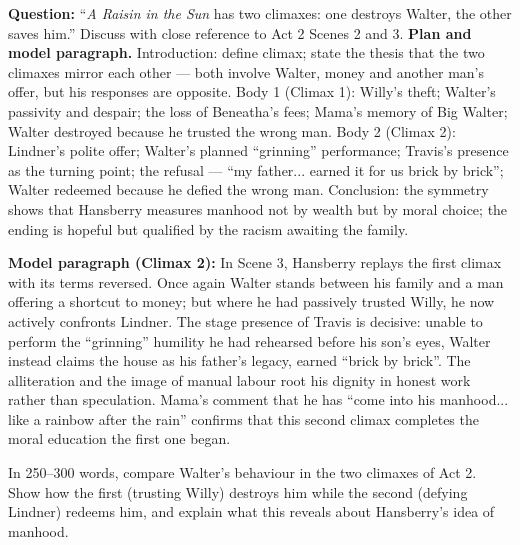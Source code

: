 \documentclass[11pt]{article}
\begin{document}
\begin{exoresolu}
\textbf{Question:} ``\emph{A Raisin in the Sun} has two climaxes: one destroys Walter, the other saves him.'' Discuss with close reference to Act 2 Scenes 2 and 3.
\tcblower
\textbf{Plan and model paragraph.} Introduction: define climax; state the thesis that the two climaxes mirror each other — both involve Walter, money and another man's offer, but his responses are opposite. Body 1 (Climax 1): Willy's theft; Walter's passivity and despair; the loss of Beneatha's fees; Mama's memory of Big Walter; Walter destroyed because he trusted the wrong man. Body 2 (Climax 2): Lindner's polite offer; Walter's planned ``grinning'' performance; Travis's presence as the turning point; the refusal — ``my father... earned it for us brick by brick''; Walter redeemed because he defied the wrong man. Conclusion: the symmetry shows that Hansberry measures manhood not by wealth but by moral choice; the ending is hopeful but qualified by the racism awaiting the family.

\textbf{Model paragraph (Climax 2):} In Scene 3, Hansberry replays the first climax with its terms reversed. Once again Walter stands between his family and a man offering a shortcut to money; but where he had passively trusted Willy, he now actively confronts Lindner. The stage presence of Travis is decisive: unable to perform the ``grinning'' humility he had rehearsed before his son's eyes, Walter instead claims the house as his father's legacy, earned ``brick by brick''. The alliteration and the image of manual labour root his dignity in honest work rather than speculation. Mama's comment that he has ``come into his manhood... like a rainbow after the rain'' confirms that this second climax completes the moral education the first one began.
\end{exoresolu}

\begin{exercice}
In 250--300 words, compare Walter's behaviour in the two climaxes of Act 2. Show how the first (trusting Willy) destroys him while the second (defying Lindner) redeems him, and explain what this reveals about Hansberry's idea of manhood.
\end{exercice}
\end{document}
